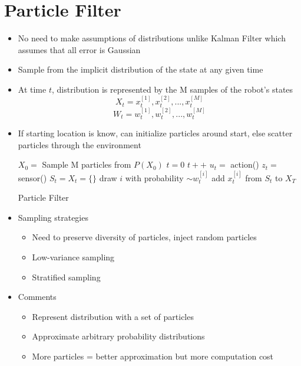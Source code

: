 \documentclass[../main.tex]{subfiles}
\begin{document}
\section{Particle Filter}
  \begin{itemize}
    \item No need to make assumptions of distributions unlike Kalman Filter which assumes that all error is Gaussian
    \item Sample from the implicit distribution of the state at any given time
    \item At time $t$, distribution is represented by the M samples of the robot's states
    \begin{equation*}
      X_{t} = x_{t}^{[1]}, x_{t}^{[2]}, ..., x_{t}^{[M]}
    \end{equation*}
    \begin{equation*}
      W_{t} = w_{t}^{[1]}, w_{t}^{[2]}, ..., w_{t}^{[M]}
    \end{equation*}
    \item If starting location is know, can initialize particles around start, else scatter particles through the environment

    \begin{algorithm}[H]
        \SetAlgoLined
        $X_{0} = $ Sample M particles from $P(X_{0})$\;
        $t = 0$\;
         {
          $t++$\;
          $u_{t} = $ action()\;
          $z_{t} = $ sensor()\;
          $S_{t} = X_{t} = \{\}$\;
           {
            draw $i$ with probability $\sim w_{t}^{[i]}$\;
            add $x_{t}^{[i]}$ from $S_{t}$ to $X_{T}$\;
          }
        }
        \caption{Particle Filter}
    \end{algorithm}
    \item Sampling strategies
      \begin{itemize}
        \item Need to preserve diversity of particles, inject random particles
        \item Low-variance sampling
        \item Stratified sampling
      \end{itemize}

    \item Comments
      \begin{itemize}
        \item Represent distribution with a set of particles
        \item Approximate arbitrary probability distributions
        \item More particles = better approximation but more computation cost
      \end{itemize}
  \end{itemize}
\end{document}
